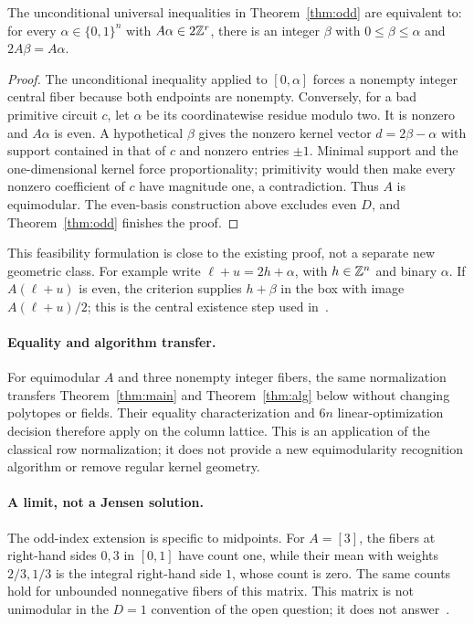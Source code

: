 \begin{corollary}\label{cor:halving}
The unconditional universal inequalities in Theorem~\ref{thm:odd} are equivalent to: for every \(\alpha\in\{0,1\}^n\) with \(A\alpha\in2\mathbb Z^r\), there is an integer \(\beta\) with \(0\le\beta\le\alpha\) and \(2A\beta=A\alpha\).
\end{corollary}
\begin{proof}
The unconditional inequality applied to \([0,\alpha]\) forces a nonempty integer central fiber because both endpoints are nonempty. Conversely, for a bad primitive circuit \(c\), let \(\alpha\) be its coordinatewise residue modulo two. It is nonzero and \(A\alpha\) is even. A hypothetical \(\beta\) gives the nonzero kernel vector \(d=2\beta-\alpha\) with support contained in that of \(c\) and nonzero entries \(\pm1\). Minimal support and the one-dimensional kernel force proportionality; primitivity would then make every nonzero coefficient of \(c\) have magnitude one, a contradiction. Thus \(A\) is equimodular. The even-basis construction above excludes even \(D\), and Theorem~\ref{thm:odd} finishes the proof.
\end{proof}
This feasibility formulation is close to the existing proof, not a separate new geometric class. For example write \(\ell+u=2h+\alpha\), with \(h\in\mathbb Z^n\) and binary \(\alpha\). If \(A(\ell+u)\) is even, the criterion supplies \(h+\beta\) in the box with image \(A(\ell+u)/2\); this is the central existence step used in~\cite[Lemma 3.3]{LMY}.

\paragraph{Equality and algorithm transfer.}
For equimodular \(A\) and three nonempty integer fibers, the same normalization transfers Theorem~\ref{thm:main} and Theorem~\ref{thm:alg} below without changing polytopes or fields. Their equality characterization and \(6n\) linear-optimization decision therefore apply on the column lattice. This is an application of the classical row normalization; it does not provide a new equimodularity recognition algorithm or remove regular kernel geometry.

\paragraph{A limit, not a Jensen solution.}
The odd-index extension is specific to midpoints. For \(A=[3]\), the fibers at right-hand sides \(0,3\) in \([0,1]\) have count one, while their mean with weights \(2/3,1/3\) is the integral right-hand side \(1\), whose count is zero. The same counts hold for unbounded nonnegative fibers of this matrix. This matrix is not unimodular in the \(D=1\) convention of the open question; it does not answer~\cite[Question 1.7]{LMY}.
